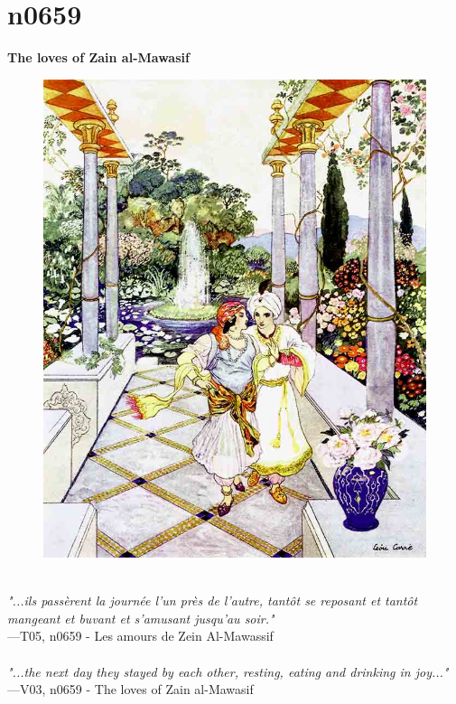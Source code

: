 \documentclass[../Carre_nights.tex]{subfiles}
\begin{document}
\newpage

\section{n0659}
\textbf{\Large{The loves of Zain al-Mawasif}} \\

\begin{figure}[ht]
\centering
\includegraphics[height=\figsize]{illustrations/volume_5/T05, n0659 - Les amours de Zein Al-Mawassif.jpg}
\end{figure}

\textit{\\
"...ils passèrent la journée l’un près de l’autre, tantôt se reposant et tantôt mangeant et buvant et s’amusant jusqu’au soir."} \\
—T05, n0659 - Les amours de Zein Al-Mawassif \\~\\
\textit{"...the next day they stayed by each other, resting, eating and drinking in joy..."} \\
—V03, n0659 - The loves of Zain al-Mawasif
\end{document}
